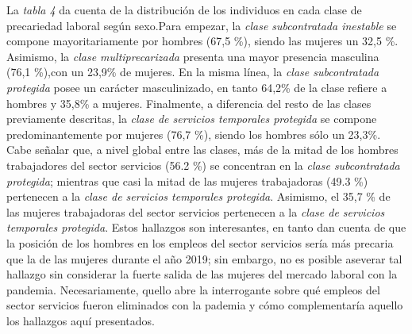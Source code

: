 \documentclass[
]{article}
\newenvironment{Shaded}{\begin{snugshade}}{\end{snugshade}}
\newcommand{\AttributeTok}[1]{\textcolor[rgb]{0.77,0.63,0.00}{#1}}
\newcommand{\CommentTok}[1]{\textcolor[rgb]{0.56,0.35,0.01}{\textit{#1}}}
\newcommand{\FunctionTok}[1]{\textcolor[rgb]{0.00,0.00,0.00}{#1}}
\newcommand{\NormalTok}[1]{#1}
\newcommand{\OtherTok}[1]{\textcolor[rgb]{0.56,0.35,0.01}{#1}}
\newcommand{\SpecialCharTok}[1]{\textcolor[rgb]{0.00,0.00,0.00}{#1}}
\newcommand{\StringTok}[1]{\textcolor[rgb]{0.31,0.60,0.02}{#1}}
\begin{document}
La \emph{tabla 4} da cuenta de la distribución de los individuos en cada
clase de precariedad laboral según sexo.Para empezar, la \emph{clase
subcontratada inestable} se compone mayoritariamente por hombres (67,5
\%), siendo las mujeres un 32,5 \%. Asimismo, la \emph{clase
multiprecarizada} presenta una mayor presencia masculina (76,1 \%),con
un 23,9\% de mujeres. En la misma línea, la \emph{clase subcontratada
protegida} posee un carácter masculinizado, en tanto 64,2\% de la clase
refiere a hombres y 35,8\% a mujeres. Finalmente, a diferencia del resto
de las clases previamente descritas, la \emph{clase de servicios
temporales protegida} se compone predominantemente por mujeres (76,7
\%), siendo los hombres sólo un 23,3\%. Cabe señalar que, a nivel global
entre las clases, más de la mitad de los hombres trabajadores del sector
servicios (56.2 \%) se concentran en la \emph{clase subcontratada
protegida}; mientras que casi la mitad de las mujeres trabajadoras (49.3
\%) pertenecen a la \emph{clase de servicios temporales protegida}.
Asimismo, el 35,7 \% de las mujeres trabajadoras del sector servicios
pertenecen a la \emph{clase de servicios temporales protegida}. Estos
hallazgos son interesantes, en tanto dan cuenta de que la posición de
los hombres en los empleos del sector servicios sería más precaria que
la de las mujeres durante el año 2019; sin embargo, no es posible
aseverar tal hallazgo sin considerar la fuerte salida de las mujeres del
mercado laboral con la pandemia. Necesariamente, quello abre la
interrogante sobre qué empleos del sector servicios fueron eliminados
con la pademia y cómo complementaría aquello los hallazgos aquí
presentados.

\begin{Shaded}
\end{Shaded}
\end{document}
